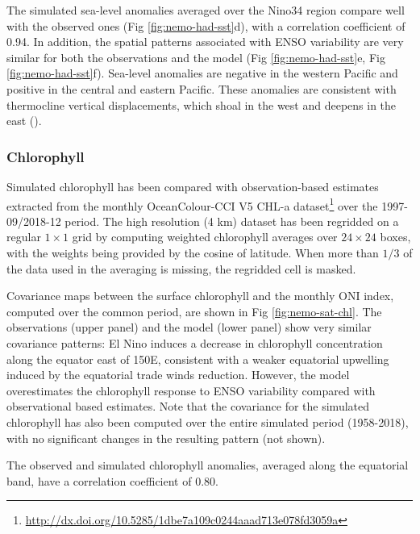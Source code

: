 The simulated sea-level anomalies averaged over the Nino34 region compare well with the observed ones (Fig \ref{fig:nemo-had-sst}d), with a correlation coefficient of 0.94. In addition, the spatial patterns associated with ENSO variability are very similar for both the observations and the model (Fig \ref{fig:nemo-had-sst}e, Fig \ref{fig:nemo-had-sst}f). Sea-level anomalies are negative in the western Pacific and positive in the central and eastern Pacific. These anomalies are consistent with thermocline vertical displacements, which shoal in the west and deepens in the east ().

\subsubsection{Chlorophyll}

Simulated chlorophyll has been compared with observation-based estimates extracted from the monthly OceanColour-CCI V5 CHL-a dataset\footnote{\url{http://dx.doi.org/10.5285/1dbe7a109c0244aaad713e078fd3059a}} \citep{sathyendranathOceanColourTimeSeries2019} over the 1997-09/2018-12 period. The high resolution (4 km)  dataset has been regridded on a regular $1\times 1$ grid by computing weighted chlorophyll averages over $24\times24$ boxes, with the weights being provided by the cosine of latitude. When more than $1/3$ of the data used in the averaging is missing, the regridded cell is masked.

Covariance maps between the surface chlorophyll and the monthly ONI index, computed over the common period, are shown in Fig \ref{fig:nemo-sat-chl}. The observations (upper panel) and the model (lower panel) show very similar covariance patterns: El Nino induces a decrease in chlorophyll concentration along the equator east of 150\degree{}E, consistent with a weaker equatorial upwelling induced by the equatorial trade winds reduction. However, the model overestimates the chlorophyll response to ENSO variability compared with observational based estimates. Note that the covariance for the simulated chlorophyll has also been computed over the entire simulated period (1958-2018), with no significant changes in the resulting pattern (not shown). 

The observed and simulated chlorophyll anomalies, averaged along the equatorial band, have a correlation coefficient of $0.80$.

